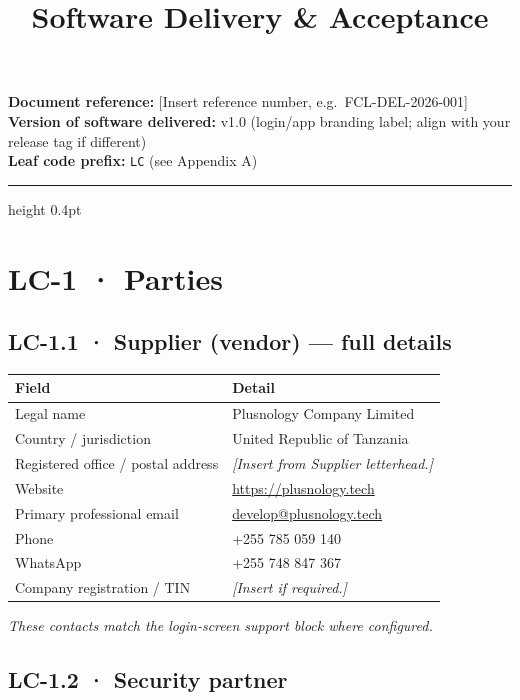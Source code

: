 \documentclass[11pt,a4paper]{article}
\title{Software Delivery \& Acceptance}
\author{}
\date{}
\begin{document}
\maketitle

\noindent\textbf{Document reference:} [Insert reference number, e.g.\ FCL-DEL-2026-001]\\
\textbf{Version of software delivered:} v1.0 (login/app branding label; align with your release tag if different)\\
\textbf{Leaf code prefix:} \texttt{LC} (see Appendix A)

\hrule height 0.4pt
\vspace{0.8em}

\section*{LC-1 · Parties}

\subsection*{LC-1.1 · Supplier (vendor) --- full details}

\begin{tabular}{@{}>{\raggedright}p{4.2cm}p{9.5cm}@{}}
\toprule
\textbf{Field} & \textbf{Detail} \\
\midrule
Legal name & Plusnology Company Limited \\
Country / jurisdiction & United Republic of Tanzania \\
Registered office / postal address & \textit{[Insert from Supplier letterhead.]} \\
Website & \url{https://plusnology.tech} \\
Primary professional email & \href{mailto:develop@plusnology.tech}{develop@plusnology.tech} \\
Phone & +255 785 059 140 \\
WhatsApp & +255 748 847 367 \\
Company registration / TIN & \textit{[Insert if required.]} \\
\bottomrule
\end{tabular}

\vspace{0.5em}
\noindent\textit{These contacts match the login-screen support block where configured.}

\subsection*{LC-1.2 · Security partner}
\end{document}
